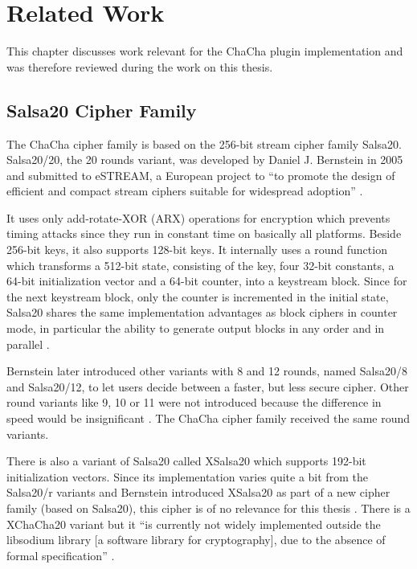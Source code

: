 
\chapter{Related Work}
\label{sec:relatedWork}

This chapter discusses work relevant for the ChaCha plugin implementation and was therefore reviewed during the work on this thesis.

\section{Salsa20 Cipher Family}
\label{sec:salsaCipher}

The ChaCha cipher family is based on the 256-bit stream cipher family Salsa20.
\noindent
Salsa20/20, the 20 rounds variant, was developed by Daniel J. Bernstein in 2005 \cite{salsaspec} and submitted to eSTREAM, a European project to ``to promote the design of efficient and compact stream ciphers suitable for widespread adoption'' \cite{estream}.

It uses only add-rotate-XOR (ARX) operations for encryption which prevents timing attacks since they run in constant time on basically all platforms. Beside 256-bit keys, it also supports 128-bit keys. It internally uses a round function which transforms a 512-bit state, consisting of the key, four 32-bit constants, a 64-bit initialization vector and a 64-bit counter, into a keystream block. Since for the next keystream block, only the counter is incremented in the initial state, Salsa20 shares the same implementation advantages as block ciphers in counter mode, in particular the ability to generate output blocks in any order and in parallel \cite{salsaspec}.

Bernstein later introduced other variants with 8 and 12 rounds, named Salsa20/8 and Salsa20/12, to let users decide between a faster, but less secure cipher. Other round variants like 9, 10 or 11 were not introduced because the difference in speed would be insignificant \cite{salsa812}. The ChaCha cipher family received the same round variants. 

There is also a variant of Salsa20 called XSalsa20 which supports 192-bit initialization vectors. Since its implementation varies quite a bit from the Salsa20/r variants and Bernstein introduced XSalsa20 as part of a new cipher family (based on Salsa20), this cipher is of no relevance for this thesis \cite{xsalsa20spec}. There is a XChaCha20 variant but it ``is currently not widely implemented outside the libsodium library [a software library for cryptography], due to the absence of formal specification'' \cite{xchacha20}.

